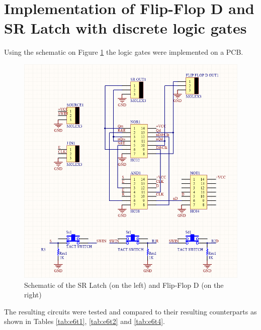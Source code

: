 \documentclass[a4paper]{article}
\begin{document}
        \section{Implementation of Flip-Flop D and SR Latch with discrete logic gates}
        Using the schematic on Figure \ref{fig:Schem} the logic gates were implemented on a PCB.
        
        \begin{figure}[h!]
            \begin{center}
                \includegraphics[width=\linewidth]{e6Schem.png}
                \caption{Schematic of the  SR Latch (on the left) and Flip-Flop D (on the right)}
            \end{center}
            \label{fig:Schem}
        \end{figure}

        The resulting circuits were tested and compared to their resulting counterparts as shown in
        Tables \ref{tab:e6t1}, \ref{tab:e6t2} and \ref{tab:e6t4}.

        \begin{table}[ht]
            \begin{center}
                
                \label{tab:e6t1}
            \end{center}
        \end{table}
        \begin{table}[ht]
            \begin{center}
                
                \label{tab:e6t2}
            \end{center}
        \end{table}
        \begin{table}[ht]
            \begin{center}
                
                \label{tab:e6t4}
            \end{center}
        \end{table}
    
\end{document}
